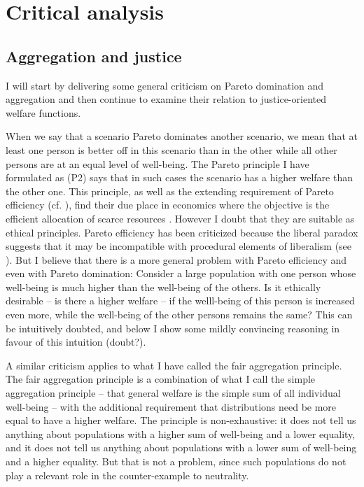 \chapter{Critical analysis}
\section{Aggregation and justice}
\label{sec:obj1}

I will start by delivering some general criticism on Pareto domination and aggregation and then continue to examine their relation to justice-oriented welfare functions.  

When we say that a scenario Pareto dominates another scenario, we mean that at least one person is better off in this scenario than in the other while all other persons are at an equal level of well-being. The Pareto principle I have formulated as (P2) says that in such cases the scenario has a higher welfare than the other one. This principle, as well as the extending requirement of Pareto efficiency (cf. ), find their due place in economics where the objective is the efficient allocation of scarce resources \cite[p.~4]{samuelson_2010}. However I doubt that they are suitable as ethical principles. Pareto efficiency has been criticized because the liberal paradox suggests that it may be incompatible with procedural elements of liberalism (see \cite{sen_1997}). But I believe that there is a more general problem with Pareto efficiency and even with Pareto domination: Consider a large population with one person whose well-being is much higher than the well-being of the others. Is it ethically desirable – is there a higher welfare – if the welll-being of this person is increased even more, while the well-being of the other persons remains the same? This can be intuitively doubted, and below I show some mildly convincing reasoning in favour of this intuition (doubt?).  

A similar criticism applies to what I have called the fair aggregation principle. The fair aggregation principle is a combination of what I call the simple aggregation principle – that general welfare is the simple sum of all individual well-being – with the additional requirement that distributions need be more equal to have a higher welfare. The principle is non-exhaustive: it does not tell us anything about populations with a higher sum of well-being and a lower equality, and it does not tell us anything about populations with a lower sum of well-being and a higher equality. But that is not a problem, since such populations do not play a relevant role in the counter-example to neutrality.  

